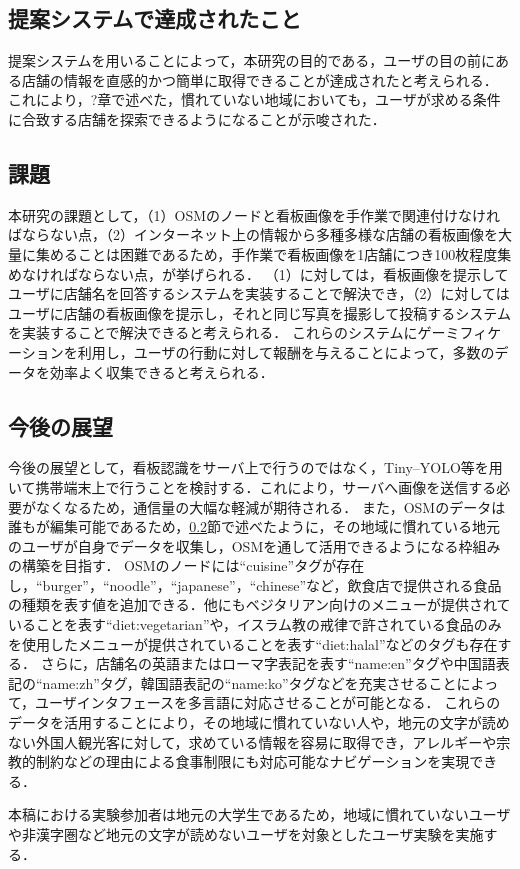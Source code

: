 \subsection{提案システムで達成されたこと}
  提案システムを用いることによって，本研究の目的である，ユーザの目の前にある店舗の情報を直感的かつ簡単に取得できることが達成されたと考えられる．
  これにより，?章で述べた，慣れていない地域においても，ユーザが求める条件に合致する店舗を探索できるようになることが示唆された．

\subsection{課題}
\label{sec:limitation}
  本研究の課題として，（1）OSMのノードと看板画像を手作業で関連付けなければならない点，（2）インターネット上の情報から多種多様な店舗の看板画像を大量に集めることは困難であるため，手作業で看板画像を1店舗につき100枚程度集めなければならない点，が挙げられる．
  （1）に対しては，看板画像を提示してユーザに店舗名を回答するシステムを実装することで解決でき，（2）に対してはユーザに店舗の看板画像を提示し，それと同じ写真を撮影して投稿するシステムを実装することで解決できると考えられる．
  これらのシステムにゲーミフィケーションを利用し，ユーザの行動に対して報酬を与えることによって，多数のデータを効率よく収集できると考えられる．

\subsection{今後の展望}
  今後の展望として，看板認識をサーバ上で行うのではなく，Tiny--YOLO等を用いて携帯端末上で行うことを検討する．これにより，サーバへ画像を送信する必要がなくなるため，通信量の大幅な軽減が期待される．
  また，OSMのデータは誰もが編集可能であるため，\ref{sec:limitation}節で述べたように，その地域に慣れている地元のユーザが自身でデータを収集し，OSMを通して活用できるようになる枠組みの構築を目指す．
  OSMのノードには``cuisine''タグが存在し，``burger''，``noodle''，``japanese''，``chinese''など，飲食店で提供される食品の種類を表す値を追加できる．他にもベジタリアン向けのメニューが提供されていることを表す``diet:vegetarian''や，イスラム教の戒律で許されている食品のみを使用したメニューが提供されていることを表す``diet:halal''などのタグも存在する．
  さらに，店舗名の英語またはローマ字表記を表す``name:en''タグや中国語表記の``name:zh''タグ，韓国語表記の``name:ko''タグなどを充実させることによって，ユーザインタフェースを多言語に対応させることが可能となる．
  これらのデータを活用することにより，その地域に慣れていない人や，地元の文字が読めない外国人観光客に対して，求めている情報を容易に取得でき，アレルギーや宗教的制約などの理由による食事制限にも対応可能なナビゲーションを実現できる．
  
  本稿における実験参加者は地元の大学生であるため，地域に慣れていないユーザや非漢字圏など地元の文字が読めないユーザを対象としたユーザ実験を実施する．
